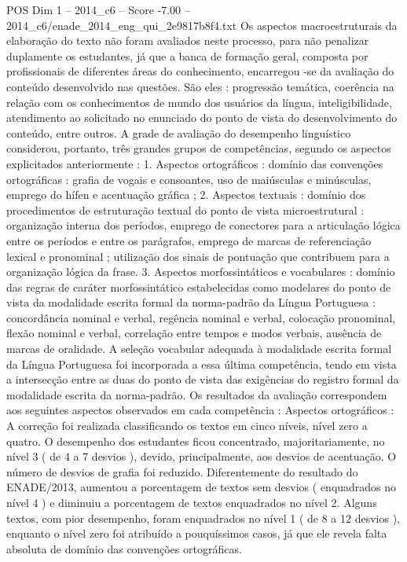 \begin{textsample}{POS Dim 1 – 2014\_c6 – Score -7.00 – 2014\_c6/enade\_2014\_eng\_qui\_2e9817b8f4.txt}
Os aspectos macroestruturais da elaboração do texto não foram avaliados neste processo, para não penalizar duplamente os estudantes, já que a banca de formação geral, composta por profissionais de diferentes áreas do conhecimento, encarregou -se da avaliação do conteúdo desenvolvido nas questões.
São eles : progressão temática, coerência na relação com os conhecimentos de mundo dos usuários da língua, inteligibilidade, atendimento ao solicitado no enunciado do ponto de vista do desenvolvimento do conteúdo, entre outros.
A grade de avaliação do desempenho linguístico considerou, portanto, três grandes grupos de competências, segundo os aspectos explicitados anteriormente : 1.
Aspectos ortográficos : domínio das convenções ortográficas : grafia de vogais e consoantes, uso de maiúsculas e minúsculas, emprego do hífen e acentuação gráfica ; 2.
Aspectos textuais : domínio dos procedimentos de estruturação textual do ponto de vista microestrutural : organização interna dos períodos, emprego de conectores para a articulação lógica entre os períodos e entre os parágrafos, emprego de marcas de referenciação lexical e pronominal ; utilização dos sinais de pontuação que contribuem para a organização lógica da frase. 3.
Aspectos morfossintáticos e vocabulares : domínio das regras de caráter morfossintático estabelecidas como modelares do ponto de vista da modalidade escrita formal da norma-padrão da Língua Portuguesa : concordância nominal e verbal, regência nominal e verbal, colocação pronominal, flexão nominal e verbal, correlação entre tempos e modos verbais, ausência de marcas de oralidade.
A seleção vocabular adequada à modalidade escrita formal da Língua Portuguesa foi incorporada a essa última competência, tendo em vista a intersecção entre as duas do ponto de vista das exigências do registro formal da modalidade escrita da norma-padrão.
Os resultados da avaliação correspondem aos seguintes aspectos observados em cada competência : Aspectos ortográficos : A correção foi realizada classificando os textos em cinco níveis, nível zero a quatro.
O desempenho dos estudantes ficou concentrado, majoritariamente, no nível 3 ( de 4 a 7 desvios ), devido, principalmente, aos desvios de acentuação.
O número de desvios de grafia foi reduzido.
Diferentemente do resultado do ENADE/2013, aumentou a porcentagem de textos sem desvios ( enquadrados no nível 4 ) e diminuiu a porcentagem de textos enquadrados no nível 2.
Alguns textos, com pior desempenho, foram enquadrados no nível 1 ( de 8 a 12 desvios ), enquanto o nível zero foi atribuído a pouquíssimos casos, já que ele revela falta absoluta de domínio das convenções ortográficas.

\end{textsample}
